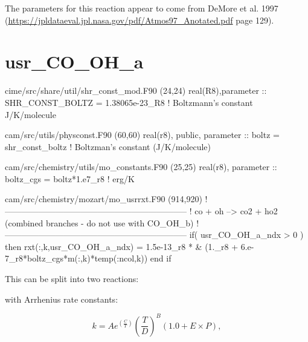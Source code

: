 \documentclass[titlepage]{article}
\begin{document}
The parameters for this reaction appear to come from DeMore et al. 1997 (\url{https://jpldataeval.jpl.nasa.gov/pdf/Atmos97_Anotated.pdf} page 129).



\section{usr\_CO\_OH\_a}

\begin{blockcode}[commandchars=\\\{\}]
\color{gray}cime/src/share/util/shr_const_mod.F90 (24,24)
   real(R8),parameter :: SHR_CONST_BOLTZ   = 1.38065e-23_R8  ! Boltzmann's constant ~ J/K/molecule
\end{blockcode}
\begin{blockcode}[commandchars=\\\{\}]
\color{gray}cam/src/utils/physconst.F90 (60,60)
real(r8), public, parameter :: boltz       = shr_const_boltz      ! Boltzman's constant (J/K/molecule)
\end{blockcode}
\begin{blockcode}[commandchars=\\\{\}]
\color{gray}cam/src/chemistry/utils/mo_constants.F90 (25,25)
  real(r8), parameter ::  boltz_cgs   = boltz*1.e7_r8       ! erg/K
\end{blockcode}
\begin{blockcode}[commandchars=\\\{\}]
\color{gray}cam/src/chemistry/mozart/mo_usrrxt.F90 (914,920)
!-----------------------------------------------------------------
!           co + oh --> co2 + ho2     (combined branches - do not use with CO_OH_b)
!-----------------------------------------------------------------
       if( usr_CO_OH_a_ndx > 0 ) then
          rxt(:,k,usr_CO_OH_a_ndx) = 1.5e-13_r8 * &
               (1._r8 + 6.e-7_r8*boltz_cgs*m(:,k)*temp(:ncol,k))
       end if
\end{blockcode}

This can be split into two reactions:
\vspace{20px}



\vspace{20px}

\noindent with Arrhenius rate constants:

\begin{equation}
k = Ae^{(\frac{C}{T})}(\frac{T}{D})^B(1.0+E \times P),
\end{equation}
\end{document}
